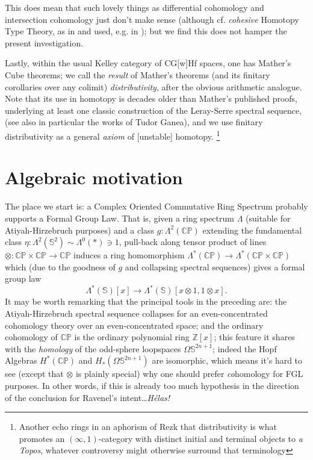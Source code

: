 \documentclass{article}
\newcommand{\CP}{\mathbb{CP}}
\newcommand{\ZZ}{\mathbb{Z}}
\newcommand{\sph}{\mathbb{S}}
\newcommand{\6}{\partial}
\newcommand{\8}{\infty}
\begin{document}
This does mean that such lovely things as differential cohomology and intersection cohomology just don't make sense
 (although cf. {\em cohesive} Homotopy Type Theory, as in \cite{schreiber} and used, e.g. in \cite{shulman});
 but we find this does not hamper the present investigation.

Lastly, within the usual Kelley category of CG[w]Hf spaces, one has Mather's Cube theorems; we call the {\em result} of Mather's theorems
 (and its finitary corollaries over any colimit) {\em distributivity}, after the obvious arithmetic analogue.  
Note that its use in homotopy is decades older than Mather's published proofs, underlying at least one classic construction of the Leray-Serre spectral sequence,
 (see also in particular the works of Tudor Ganea),
 and we use finitary distributivity as a general {\em axiom} of [unstable] homotopy.  
\footnote{Another echo rings in an aphorism of Rezk that distributivity is what promotes an $(\infty,1)$-category with distinct initial and terminal objects to {\em a Topos}, whatever controversy might otherwise surround that terminology}

\section{Algebraic motivation}
The place we start is: a Complex Oriented Commutative Ring Spectrum probably supports a Formal Group Law.  
That is, given a ring spectrum $\Lambda$ (suitable for Atiyah-Hirzebruch purposes) and a class 
 $g : \Lambda^2(\CP)$ extending the fundamental class $\eta: \Lambda^2(\sph^2)\sim \Lambda^0(*)\ni 1$,
 pull-back along tensor product of lines $\otimes: \CP\times\CP \to \CP$ induces a ring homomorphism
 $\Lambda^*(\CP) \to \Lambda^*(\CP\times\CP)$ which (due to the goodness of $g$ and collapsing spectral sequences) gives a formal group law
$$ \Lambda^*(\sph)[x] \to \Lambda^*(\sph)[x\otimes 1,1\otimes x] .$$
It may be worth remarking that the principal tools in the preceding are:
 the Atiyah-Hirzebruch spectral sequence collapses for an even-concentrated cohomology theory over an even-concentrated space;
 and the ordinary cohomology of $\CP$ is the ordinary polynomial ring $\ZZ[x]$;
 this feature it shares with the \textit{homology} of the odd-sphere loopspaces $\Omega \sph^{2n+1}$;
 indeed the Hopf Algebras $H^*(\CP)$ and $H_*(\Omega\sph^{2n+1})$ are isomorphic, which means it's hard to see
 (except that $\otimes$ is plainly special) why one should prefer {\em co}homology for FGL purposes.  
In other words, if this is already too much hypothesis in the direction of the conclusion for Ravenel's intent\dots \textit{H\'elas!}
\end{document}
